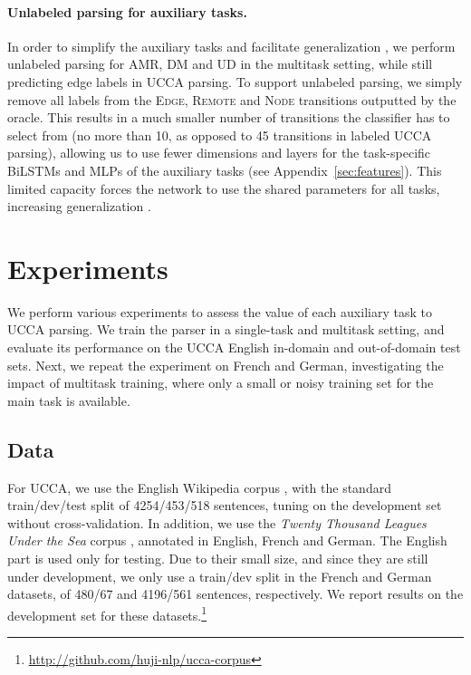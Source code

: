 \documentclass[11pt,a4paper]{article}
\begin{document}
\paragraph{Unlabeled parsing for auxiliary tasks.}
In order to simplify the auxiliary tasks and facilitate generalization \cite{E17-2026,E17-1005},
we perform unlabeled parsing for AMR, DM and UD in the multitask setting,
while still predicting edge labels in UCCA parsing.
To support unlabeled parsing, we simply remove all labels from the
\textsc{Edge}, \textsc{Remote} and \textsc{Node} transitions outputted by the oracle.
This results in a much smaller number of transitions the classifier has to select from
(no more than 10, as opposed to 45 transitions in labeled UCCA parsing),
allowing us to use fewer dimensions and layers for the task-specific BiLSTMs and MLPs
of the auxiliary tasks (see Appendix~\ref{sec:features}).
This limited capacity forces the network to use the shared parameters for all tasks,
increasing generalization \cite{E17-1005}.



\section{Experiments}\label{sec:experiments}

We perform various experiments to assess the value of each auxiliary task to UCCA parsing.
We train the parser in a single-task and multitask setting,
and evaluate its performance on the UCCA English in-domain and out-of-domain test sets.
Next, we repeat the experiment on French and German, investigating the impact of multitask
training, where only a small or noisy training set for the main task is available.

\subsection{Data}\label{sec:data}

For UCCA, we use the English Wikipedia corpus \cite{abend2013universal},
with the standard train/dev/test split of 4254/453/518 sentences,
tuning on the development set without cross-validation.
In addition, we use
the \textit{Twenty Thousand Leagues Under the Sea} corpus \cite[20K leagues;][]{sulem2015conceptual},
annotated in English, French and German.
The English part is used only for testing.
Due to their small size, and since they are still under development, we only use a train/dev split
in the French and German datasets, of 480/67 and 4196/561 sentences, respectively.
We report results on the development set for these
datasets.\footnote{\mbox{\url{http://github.com/huji-nlp/ucca-corpus}}}
\end{document}

